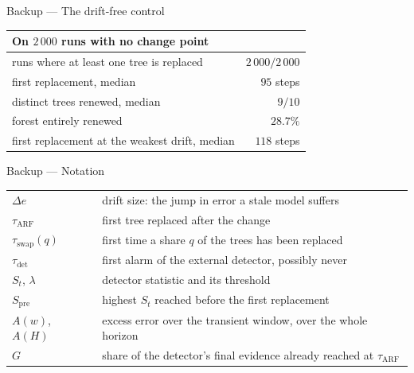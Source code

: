 \documentclass[aspectratio=169,11pt]{beamer}
\begin{document}
\begin{frame}{Backup --- The drift-free control}
  \begin{center}
    \begin{tabular}{@{}lr@{}}
      \toprule
      On $2\,000$ runs with no change point & \\
      \midrule
      runs where at least one tree is replaced & $2\,000/2\,000$ \\
      first replacement, median & $95$ steps \\
      distinct trees renewed, median & $9/10$ \\
      forest entirely renewed & $28.7\%$ \\
      \midrule
      first replacement at the weakest drift, median & $118$ steps \\
      \bottomrule
    \end{tabular}
  \end{center}
\end{frame}

\begin{frame}{Backup --- Notation}
  \begin{center}
    \small
    \begin{tabular}{@{}ll@{}}
      \toprule
      $\Delta e$ & drift size: the jump in error a stale model suffers \\
      $\tau_{\mathrm{ARF}}$ & first tree replaced after the change \\
      $\tau_{\mathrm{swap}}(q)$ & first time a share $q$ of the trees has been replaced \\
      $\tau_{\mathrm{det}}$ & first alarm of the external detector, possibly never \\
      $S_t$, $\lambda$ & detector statistic and its threshold \\
      $S_{\mathrm{pre}}$ & highest $S_t$ reached before the first replacement \\
      $A(w)$, $A(H)$ & excess error over the transient window, over the whole horizon \\
      $G$ & share of the detector's final evidence already reached at $\tau_{\mathrm{ARF}}$ \\
      \bottomrule
    \end{tabular}
  \end{center}
\end{frame}
\end{document}
